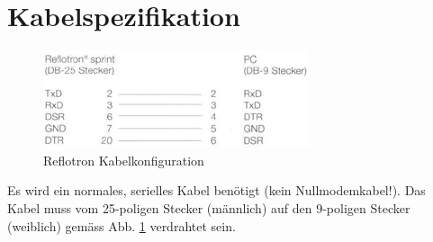 \documentclass[a4paper]{scrartcl}
\begin{document}
\section{Kabelspezifikation}
\begin{figure}[h]
    \includegraphics{kabel}
    \caption{Reflotron Kabelkonfiguration}
    \label{fig:kabel}
\end{figure}
Es wird ein normales, serielles Kabel ben\"otigt (kein Nullmodemkabel!). Das Kabel muss vom 25-poligen Stecker (m\"annlich) auf den 9-poligen Stecker (weiblich) gem\"ass Abb. \ref{fig:kabel} verdrahtet sein.
\end{document}
